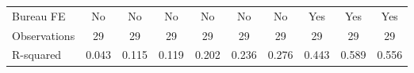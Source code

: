 {\begin{tabular}{l*{9}{c}}
Bureau FE   &          No         &          No         &          No         &          No         &          No         &          No         &         Yes         &         Yes         &         Yes         \\
Observations&          29         &          29         &          29         &          29         &          29         &          29         &          29         &          29         &          29         \\
R-squared   &       0.043         &       0.115         &       0.119         &       0.202         &       0.236         &       0.276         &       0.443         &       0.589         &       0.556         \\
\bottomrule
\end{tabular}
}
